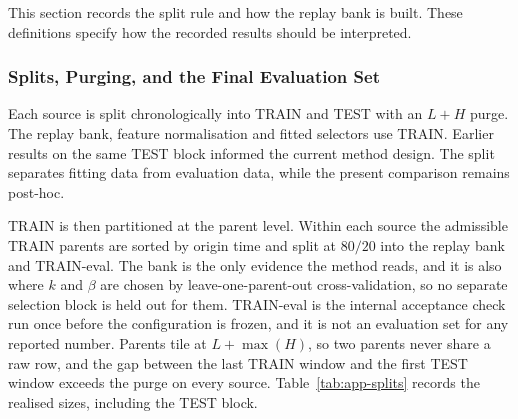 \documentclass{article}
\begin{document}
This section records the split rule and how the replay bank is built. These definitions specify how the recorded results should be interpreted.

\subsubsection{Splits, Purging, and the Final Evaluation Set}
\label{app:splits}
Each source is split chronologically into TRAIN and TEST with an $L+H$ purge.
The replay bank, feature normalisation and fitted selectors use TRAIN. Earlier results on
the same TEST block informed the current method design. The split separates fitting data
from evaluation data, while the present comparison remains post-hoc.

TRAIN is then partitioned at the parent level. Within each source the admissible TRAIN parents
are sorted by origin time and split at $80/20$ into the replay bank and TRAIN-eval. The bank is
the only evidence the method reads, and it is also where $k$ and $\beta$ are chosen by
leave-one-parent-out cross-validation, so no separate selection block is held out for them.
TRAIN-eval is the internal acceptance check run once before the configuration is frozen, and
it is not an evaluation set for any reported number. Parents tile at $L + \max(H)$, so two
parents never share a raw row, and the gap between the last TRAIN window and the first TEST
window exceeds the purge on every source.
Table~\ref{tab:app-splits} records the realised sizes, including the TEST block.

\begin{table}[htbp]
  \caption{Realised split sizes. Counts are of admissible parents and not of correlated mask
  variants, so a parent with several patterns or severities still contributes one unit to
  every statistic in the paper. TEST is the evaluation population for every table in the main
  text, and it is disjoint from both TRAIN blocks.}
  \label{tab:app-splits}
  \centering
  \small
  \setlength{\tabcolsep}{4pt}
\end{table}
\end{document}
